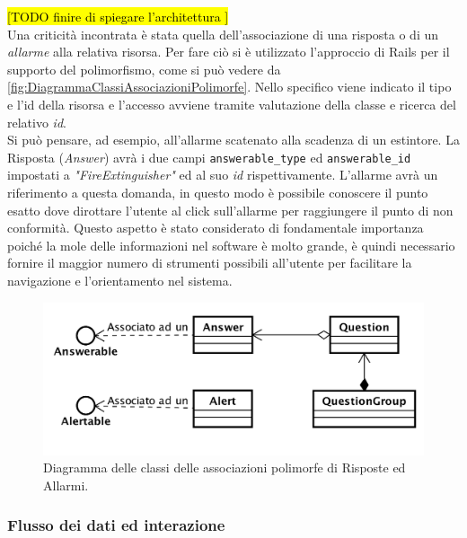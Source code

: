 \hl{[TODO finire di spiegare l'architettura ]}\\
Una criticità incontrata è stata quella dell'associazione di una risposta o di un \textit{allarme} alla relativa risorsa. Per fare ciò si è utilizzato l'approccio di Rails per il supporto del polimorfismo, come si può vedere da  \autoref{fig:DiagrammaClassiAssociazioniPolimorfe}. Nello specifico viene indicato il tipo e l'id della risorsa e l'accesso avviene tramite valutazione della classe e ricerca del relativo \textit{id}. \\
Si può pensare, ad esempio, all'allarme scatenato alla scadenza di un estintore. 
La Risposta (\textit{Answer}) avrà i due campi \texttt{answerable\_type} ed \texttt{answerable\_id} impostati a \textit{"FireExtinguisher"} ed al suo \textit{id} rispettivamente.  L'allarme avrà un riferimento a questa domanda, in questo modo è possibile conoscere il punto esatto dove dirottare l'utente al click sull'allarme per raggiungere il punto di non conformità. Questo aspetto è stato considerato di fondamentale importanza poiché la mole delle informazioni nel software è molto grande, è quindi necessario fornire il maggior numero di strumenti possibili all'utente per facilitare la navigazione e l'orientamento nel sistema.
\begin{figure}[H]
	\begin{center}
		\includegraphics[width=14cm]{Pics/diagramma_classi_associazioni_polimorfe.png}
		\caption{Diagramma delle classi delle associazioni polimorfe di Risposte ed Allarmi.}
		\label{fig:DiagrammaClassiAssociazioniPolimorfe}
	\end{center}
\end{figure}



\subsubsection{Flusso dei dati ed interazione}

